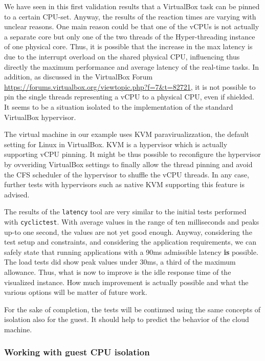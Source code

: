 \documentclass[]{scrartcl}
\begin{document}
We have seen in this first validation results that a VirtualBox task can be pinned to a certain CPU-set. Anyway, the results of the reaction times are varying with unclear reasons. 
One main reason could be that one of the vCPUs is not actually a separate core but only one of the two threads of the Hyper-threading instance of one physical core. 
Thus, it is possible that the increase in the max latency is due to the interrupt overload on the shared physical CPU, influencing thus directly the maximum performance and average latency of the real-time tasks.
In addition, as discussed in the VirtualBox Forum \url{https://forums.virtualbox.org/viewtopic.php?f=7&t=82721}, it is not possible to pin the single threads representing a vCPU to a physical CPU, even if shielded. It seems to be a situation isolated to the implementation of the standard VirtualBox hypervisor. 

The virtual machine in our example uses KVM paravirualizzation, the default setting for Linux in VirtualBox. 
KVM is a hypervisor which is actually supporting vCPU pinning. It might be thus possible to reconfigure the hypervisor by ovveriding VirtualBox settings to  finally allow the thread pinning and avoid the CFS scheduler of the hypervisor to shuffle the vCPU threads.
In any case, further tests with hypervisors such as native KVM supporting this feature is advised.

The results of the \texttt{latency} tool are very similar to the initial tests performed with \texttt{cyclictest}. With average values in the range of ten milliseconds and peaks up-to one second, the values are not yet good enough. 
Anyway, considering the test setup and constraints, and considering the application requirements, we can safely state that running applications with a 90ms admissible latency \textbf{is} possible. The load tests did show peak values under 30ms, a third of the maximum allowance. 
Thus, what is now to improve is the idle response time of the visualized instance. How much improvement is actually possible and what the various options will be matter of future work.

For the sake of completion, the tests will be continued using the same concepts of isolation also for the guest. It should help to predict the behavior of the cloud machine.

\subsubsection{Working with guest CPU isolation}
\end{document}
